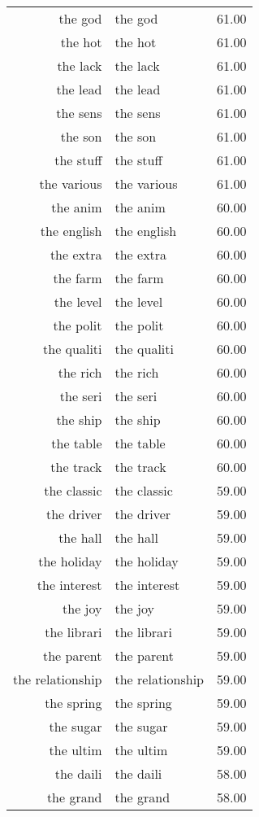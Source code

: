 \begin{table}[ht]
\begin{tabular}{rlr}
  the god & the god & 61.00 \\ 
  the hot & the hot & 61.00 \\ 
  the lack & the lack & 61.00 \\ 
  the lead & the lead & 61.00 \\ 
  the sens & the sens & 61.00 \\ 
  the son & the son & 61.00 \\ 
  the stuff & the stuff & 61.00 \\ 
  the various & the various & 61.00 \\ 
  the anim & the anim & 60.00 \\ 
  the english & the english & 60.00 \\ 
  the extra & the extra & 60.00 \\ 
  the farm & the farm & 60.00 \\ 
  the level & the level & 60.00 \\ 
  the polit & the polit & 60.00 \\ 
  the qualiti & the qualiti & 60.00 \\ 
  the rich & the rich & 60.00 \\ 
  the seri & the seri & 60.00 \\ 
  the ship & the ship & 60.00 \\ 
  the table & the table & 60.00 \\ 
  the track & the track & 60.00 \\ 
  the classic & the classic & 59.00 \\ 
  the driver & the driver & 59.00 \\ 
  the hall & the hall & 59.00 \\ 
  the holiday & the holiday & 59.00 \\ 
  the interest & the interest & 59.00 \\ 
  the joy & the joy & 59.00 \\ 
  the librari & the librari & 59.00 \\ 
  the parent & the parent & 59.00 \\ 
  the relationship & the relationship & 59.00 \\ 
  the spring & the spring & 59.00 \\ 
  the sugar & the sugar & 59.00 \\ 
  the ultim & the ultim & 59.00 \\ 
  the daili & the daili & 58.00 \\ 
  the grand & the grand & 58.00 \\ 

\end{tabular}
\end{table}
